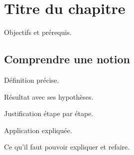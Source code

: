 \documentclass[11pt,a4paper,oneside]{book}
\begin{document}
\frontmatter\tableofcontents\mainmatter
\chapter{Titre du chapitre}
\begin{objectif}
Objectifs et prérequis.
\end{objectif}
\section{Comprendre une notion}
\begin{definition}[Nom]
Définition précise.
\end{definition}
\begin{propriete}
Résultat avec ses hypothèses.
\end{propriete}
\begin{demonstration}
Justification étape par étape.
\end{demonstration}
\begin{exemple}
Application expliquée.
\end{exemple}
\begin{retenir}
Ce qu'il faut pouvoir expliquer et refaire.
\end{retenir}
\end{document}
